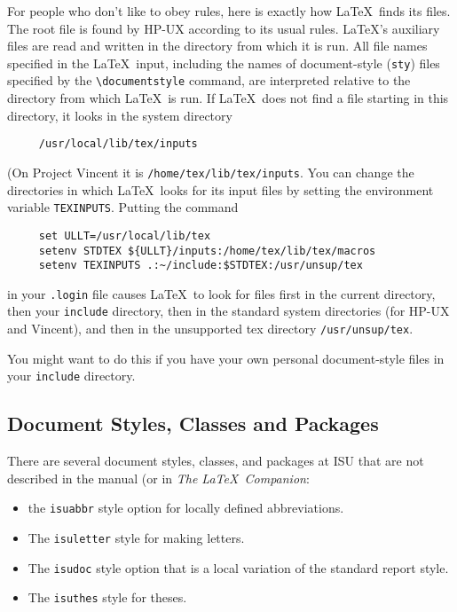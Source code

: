 \documentclass{article}
\begin{document}
For people who don't like to obey rules, 
here is exactly how \LaTeX\ finds its
files.  The root file is found by HP-UX according to its usual rules.
\LaTeX's auxiliary files are read and written in the directory from
which it is run.  All file names specified in the \LaTeX\ input,
including the names of document-style ({\tt sty}) files specified by
the \hbox{\verb|\documentstyle|} command, are interpreted relative to
the directory from which \LaTeX\ is run.  If \LaTeX\ does not find a
file starting in this directory, it looks in the system directory
\begin{verbatim}
     /usr/local/lib/tex/inputs
\end{verbatim}
(On Project Vincent it is \hbox{\verb|/home/tex/lib/tex/inputs|}.
You can change the directories in
which \LaTeX\ looks for its input files by setting the environment
variable \mbox{\tt TEXINPUTS}.  Putting the command
\begin{verbatim}
     set ULLT=/usr/local/lib/tex
     setenv STDTEX ${ULLT}/inputs:/home/tex/lib/tex/macros
     setenv TEXINPUTS .:~/include:$STDTEX:/usr/unsup/tex
\end{verbatim}
in your \mbox{\tt .login} file causes \LaTeX\ to look for files first
in the current directory, then your {\tt include} directory,
then in the standard system directories (for HP-UX and Vincent),
and
then in the unsupported tex directory {\tt /usr/unsup/tex}.

You might want to do this if
you have your own personal document-style files in your
{\tt include} directory. 

\subsection{Document Styles, Classes and Packages}

There are several document styles, classes, and packages
at ISU that are not described in the manual (or in {\em The \LaTeX\ Companion}: 
\begin{itemize}
\item the \mbox{\tt isuabbr} style option for
locally defined abbreviations.

\item The \mbox{\tt isuletter} style for making letters.

\item The {\tt isudoc} style option that is a local variation of the
standard report style.

\item The {\tt isuthes} style for theses.
\end{itemize} 
\end{document}

